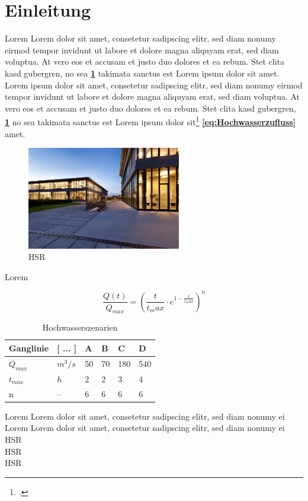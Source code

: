 \section{Einleitung}


Lorem Lorem dolor sit amet, consetetur sadipscing elitr, sed diam nonumy eirmod tempor invidunt ut labore et dolore magna aliquyam erat, sed diam voluptua. At vero eos et accusam et justo duo dolores et \autocite[22]{Roppel2006} ea rebum. Stet clita kasd gubergren, no sea \textbf{\ref{tab:Hochwasserszenarien}} takimata sanctus est Lorem ipsum dolor sit amet. Lorem ipsum dolor sit amet, consetetur sadipscing elitr, sed diam nonumy eirmod tempor invidunt ut labore et dolore magna aliquyam erat, sed diam voluptua. At vero eos et accusam et justo duo dolores et ea rebum. Stet clita kasd gubergren, \textbf{\ref{fig:HSR}} no sea takimata sanctus est Lorem ipsum dolor sit\footcite{Roppel2006} \textbf{\ref{eq:Hochwasserzufluss}} amet.

\begin{figure}[ht]
	\centering
	\includegraphics[width=0.6\textwidth]{images/HSR.jpg}
	\caption{\acs{HSR} \autocite{IR}}
	\label{fig:HSR}
\end{figure}

Lorem

 \begin{equation}\label{eq:Hochwasserzufluss}
\frac{Q(t)}{Q_{max}} = \left(\frac{t}{t_max}\cdot e^{1-\frac{t}{t_max}} \right)^n
\end{equation}

\begin{table}[ht]
    \centering
	\begin{tabular}{|l|l|l|l|l|l|}
		\hline 
		\textbf{Ganglinie}	&\textbf{[ ... ]}  	& \textbf{A} 	 & \textbf{B}  	& \textbf{C} 	& \textbf{D}  \\ 
		\hline 
		$ Q_{max} $			& $ m^3/s $ 		& 50 			& 70		  	& 180			& 540 \\ 
		\hline 
		$ t_{max} $			& $ h $ 			& 2  			& 2 			& 3 			& 4 \\ 
		\hline 
		n					& --  				& 6  			& 6 			& 6 			& 6  \\ 
		\hline 
	\end{tabular} 
	\caption{Hochwasserszenarien}\label{tab:Hochwasserszenarien}
\end{table}

Lorem  Lorem dolor sit amet, consetetur sadipscing elitr, sed diam nonumy ei\\

Lorem  Lorem dolor sit amet, consetetur sadipscing elitr, sed diam nonumy ei \\
\ac{HSR}\\
\acs{HSR}\\
\acl{HSR}


\clearpage